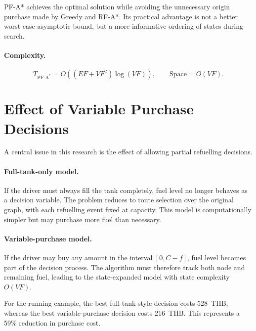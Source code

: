 PF-A* achieves the optimal solution while avoiding the unnecessary origin purchase made by Greedy and RF-A*. Its practical advantage is not a better worst-case asymptotic bound, but a more informative ordering of states during search.

\paragraph{Complexity.}
\[
T_{\mathrm{PF\text{-}A^{*}}}=O\!\left((EF+VF^{2})\log(VF)\right),
\qquad
\text{Space}=O(VF).
\]

\section{Effect of Variable Purchase Decisions}
\label{sec:variable_purchase}

A central issue in this research is the effect of allowing partial refuelling decisions.

\paragraph{Full-tank-only model.}
If the driver must always fill the tank completely, fuel level no longer behaves as a decision variable. The problem reduces to route selection over the original graph, with each refuelling event fixed at capacity. This model is computationally simpler but may purchase more fuel than necessary.

\paragraph{Variable-purchase model.}
If the driver may buy any amount in the interval $[0,C-f]$, fuel level becomes part of the decision process. The algorithm must therefore track both node and remaining fuel, leading to the state-expanded model with state complexity $O(VF)$.

For the running example, the best full-tank-style decision costs 528~THB, whereas the best variable-purchase decision costs 216~THB. This represents a 59\% reduction in purchase cost.


